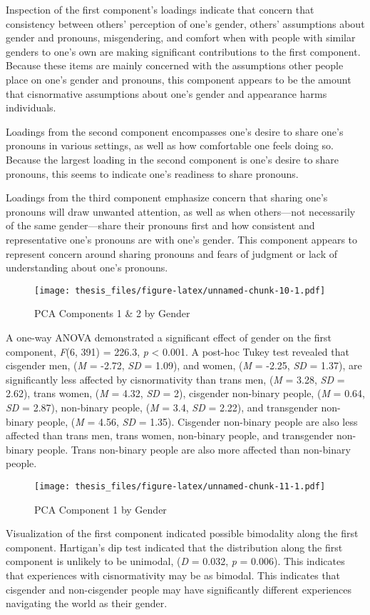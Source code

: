 \documentclass[12pt,twoside]{reedthesis}
\begin{document}
Inspection of the first component's loadings indicate that concern that consistency between others' perception of one's gender, others' assumptions about gender and pronouns, misgendering, and comfort when with people with similar genders to one's own are making significant contributions to the first component. Because these items are mainly concerned with the assumptions other people place on one's gender and pronouns, this component appears to be the amount that cisnormative assumptions about one's gender and appearance harms individuals.

Loadings from the second component encompasses one's desire to share one's pronouns in various settings, as well as how comfortable one feels doing so. Because the largest loading in the second component is one's desire to share pronouns, this seems to indicate one's readiness to share pronouns.

Loadings from the third component emphasize concern that sharing one's pronouns will draw unwanted attention, as well as when others---not necessarily of the same gender---share their pronouns first and how consistent and representative one's pronouns are with one's gender. This component appears to represent concern around sharing pronouns and fears of judgment or lack of understanding about one's pronouns.
\begin{figure}
\centering
\texttt{[image: thesis\_files/figure-latex/unnamed-chunk-10-1.pdf]}
\caption{\label{fig:unnamed-chunk-10}PCA Components 1 \& 2 by Gender}
\end{figure}
A one-way ANOVA demonstrated a significant effect of gender on the first component, \emph{F}(6, 391) = 226.3, \emph{p} \textless{} 0.001. A post-hoc Tukey test revealed that cisgender men, (\emph{M} = -2.72, \emph{SD} = 1.09), and women, (\emph{M} = -2.25, \emph{SD} = 1.37), are significantly less affected by cisnormativity than trans men, (\emph{M} = 3.28, \emph{SD} = 2.62), trans women, (\emph{M} = 4.32, \emph{SD} = 2), cisgender non-binary people, (\emph{M} = 0.64, \emph{SD} = 2.87), non-binary people, (\emph{M} = 3.4, \emph{SD} = 2.22), and transgender non-binary people, (\emph{M} = 4.56, \emph{SD} = 1.35). Cisgender non-binary people are also less affected than trans men, trans women, non-binary people, and transgender non-binary people. Trans non-binary people are also more affected than non-binary people.
\begin{figure}
\centering
\texttt{[image: thesis\_files/figure-latex/unnamed-chunk-11-1.pdf]}
\caption{\label{fig:unnamed-chunk-11}PCA Component 1 by Gender}
\end{figure}
Visualization of the first component indicated possible bimodality along the first component. Hartigan's dip test indicated that the distribution along the first component is unlikely to be unimodal, (\emph{D} = 0.032, \emph{p} = 0.006). This indicates that experiences with cisnormativity may be as bimodal. This indicates that cisgender and non-cisgender people may have significantly different experiences navigating the world as their gender.
\end{document}
